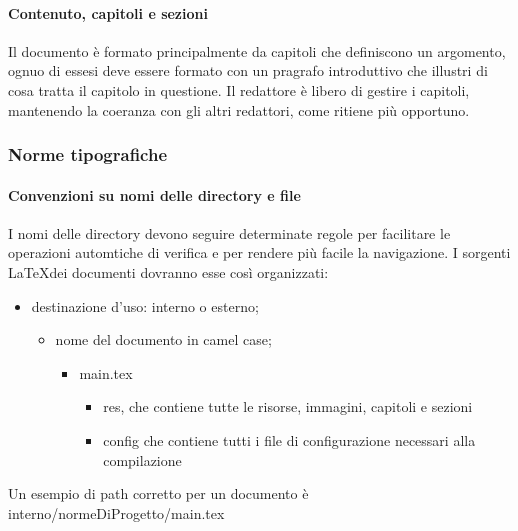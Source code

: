 \paragraph{Contenuto, capitoli e sezioni}
Il documento è formato principalmente da capitoli che definiscono un argomento,
ognuo di essesi deve essere formato con un pragrafo introduttivo che illustri
di cosa tratta il capitolo in questione.
Il redattore è libero di gestire i capitoli, mantenendo la coeranza con gli altri
redattori, come ritiene più opportuno.
\subsubsection{Norme tipografiche}
\paragraph{Convenzioni su nomi delle directory e file}
I nomi delle directory devono seguire determinate regole per facilitare le operazioni
automtiche di verifica e per rendere più facile la navigazione.
I sorgenti \LaTeX \space dei documenti dovranno esse così organizzati:
\begin{itemize}
  \item destinazione d'uso: interno o esterno;
  \begin{itemize}
    \item nome del documento in camel case;
    \begin{itemize}
      \item main.tex
      \begin{itemize}
        \item res, che contiene tutte le risorse, immagini, capitoli e sezioni
        \item config che contiene tutti i file di configurazione necessari alla compilazione
      \end{itemize}
    \end{itemize}
  \end{itemize}
\end{itemize}
Un esempio di path corretto per un documento è interno/normeDiProgetto/main.tex
